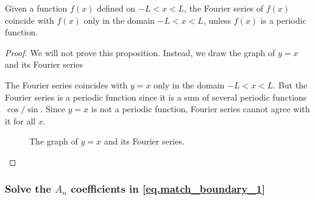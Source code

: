 \begin{proposition}[]
    Given a function $f(x)$ defined on $-L < x < L$, the Fourier series of $f(x)$ coincide with $f(x)$ only in the domain $-L < x < L$, unless $f(x)$ is a periodic function.
\end{proposition}
\begin{proof}
    We will not prove this proposition. Instead, we draw the graph of $y = x$ and its Fourier series

    The Fourier series coincides with $y = x$ only in the domain $-L < x < L$. But the Fourier series is a periodic function since it is a sum of several periodic functions $\cos/\sin$. Since $y = x$ is not a periodic function, Fourier series cannot agree with it for all $x$.
    \begin{figure}[H]
        \centering 
        \caption{The graph of $y = x$ and its Fourier series.} 
        \label{fig.fourier_x} 
    \end{figure}
\end{proof}


\subsubsection{Solve the $A_n$ coefficients in \eqref{eq.match_boundary_1}}\label{sec.A_n_coef_sep} 

